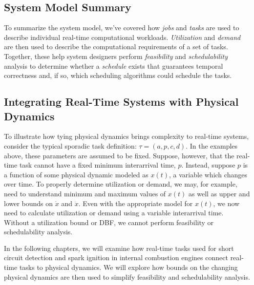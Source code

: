 \subsection{System Model Summary}

To summarize the system model, we've covered how \textit{jobs} and \textit{tasks} are used to describe individual real-time computational workloads.
\textit{Utilization} and \textit{demand} are then used to describe the computational requirements of a set of tasks.
Together, these help system designers perform \textit{feasibility} and \textit{schedulability} analysis to determine whether a \textit{schedule} exists that guarantees temporal correctness and, if so, which scheduling algorithms could schedule the tasks.

\subsection{Integrating Real-Time Systems with Physical Dynamics}

To illustrate how tying physical dynamics brings complexity to real-time systems, consider the typical sporadic task definition: $\tau = (a,p,c,d)$.
In the examples above, these parameters are assumed to be fixed.
Suppose, however, that the real-time task cannot have a fixed minimum interarrival time, $p$.
Instead, suppose $p$ is a function of some physical dynamic modeled as $x(t)$, a variable which changes over time.
To properly determine utilization or demand, we may, for example, need to understand minimum and maximum values of $x(t)$ as well as upper and lower bounds on $\dot{x}$ and $\ddot{x}$.
Even with the appropriate model for $x(t)$, we now need to calculate utilization or demand using a variable interarrival time.
Without a utilization bound or DBF, we cannot perform feasibility or schedulability analysis.

In the following chapters, we will examine how real-time tasks used for short circuit detection and spark ignition in internal combustion engines connect real-time tasks to physical dynamics.
We will explore how bounds on the changing physical dynamics are then used to simplify feasibility and schedulability analysis.